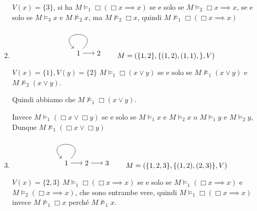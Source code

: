 \documentclass[../main.tex]{subfiles}
\begin{document}
\begin{enumerate}
          $V(x) = \{3\}$, si ha $M \vDash_1 \Box (\Box x \implies x)$ se e solo se $M \vDash_2 \Box x \implies x$, se e solo se $M \vDash_3 x$ e $M \nvDash_2 x$, ma $M \nvDash_2 \Box x$, quindi $M \nvDash_1 \Box (\Box x \implies x)$
    \item \begin{equation*}
              \begin{tikzpicture}[->]
                  \node (1) {1};
                  \node (2) [right of=1] {2};
                  \path
                  (1) edge[loop] node {} (1)
                  (1) edge node {} (2);
              \end{tikzpicture}
              \qquad
              M = (\{1,2\},\{(1,2),(1,1),\}, V)
          \end{equation*}

          $V(x) = \{1\}, V(y) = \{2\}$ $M \vDash_1 \Box (x \lor y)$ se e solo se $M \nvDash_1 (x \lor y)$ e $M \nvDash_2 (x \lor y)$.

          Quindi abbiamo che $M \nvDash_1 \Box (x \lor y)$.

          Invece $M \vDash_1 (\Box x \lor \Box y)$ se e solo se $M \vDash_1 x$ e $M \vDash_2 x$ o $M \vDash_1 y$ e $M \vDash_2 y$, Dunque $M \nvDash_1 (\Box x \lor \Box y)$
    \item \begin{equation*}
              \begin{tikzpicture}[->]
                  \node (1) {1};
                  \node (2) [right of=1] {2};
                  \node (3) [right of=2] {3};
                  \path
                  (1) edge[loop] node {} (1)
                  (1) edge node {} (2)
                  (2) edge node {} (3);
              \end{tikzpicture}
              \qquad
              M = (\{1,2,3\},\{(1,2),(2,3)\}, V)
          \end{equation*}

          $V(x) = \{2,3\}$ $M \vDash_1 \Box (\Box x \implies x)$ se e solo se $M \vDash_1 (\Box x \implies x)$ e $M \vDash_2 (\Box x \implies x)$, che sono entrambe vere, quindi $M \vDash_1 \Box (\Box x \implies x)$ invece $M \nvDash_1 \Box x$ perché $M \nvDash_1 x$.
\end{enumerate}
\end{document}
